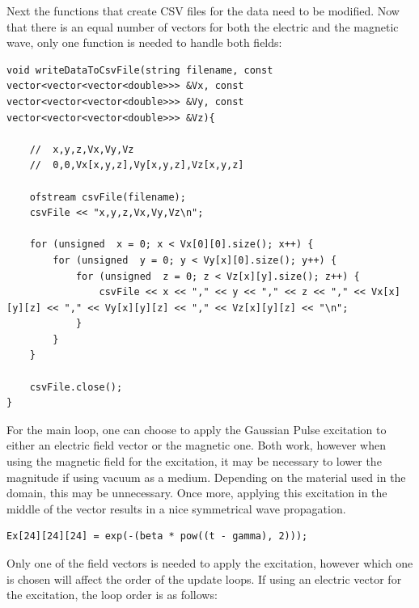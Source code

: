 Next the functions that create CSV files for the data need to be modified. Now that there is an equal number of vectors for both the electric and the magnetic wave, only one function is needed to handle both fields:

\begin{verbatim}
void writeDataToCsvFile(string filename, const vector<vector<vector<double>>> &Vx, const vector<vector<vector<double>>> &Vy, const vector<vector<vector<double>>> &Vz){
	
	//	x,y,z,Vx,Vy,Vz
	//	0,0,Vx[x,y,z],Vy[x,y,z],Vz[x,y,z]
	
	ofstream csvFile(filename);
	csvFile << "x,y,z,Vx,Vy,Vz\n";
	
	for (unsigned  x = 0; x < Vx[0][0].size(); x++) {
		for (unsigned  y = 0; y < Vy[x][0].size(); y++) {
			for (unsigned  z = 0; z < Vz[x][y].size(); z++) {
				csvFile << x << "," << y << "," << z << "," << Vx[x][y][z] << "," << Vy[x][y][z] << "," << Vz[x][y][z] << "\n";
			}
		}
	}
	
	csvFile.close();
}
\end{verbatim}

For the main loop, one can choose to apply the Gaussian Pulse excitation to either an electric field vector or the magnetic one. Both work, however when using the magnetic field for the excitation, it may be necessary to lower the magnitude if using vacuum as a medium. Depending on the material used in the domain, this may be unnecessary. Once more, applying this excitation in the middle of the vector results in a nice symmetrical wave propagation.

\begin{verbatim}
Ex[24][24][24] = exp(-(beta * pow((t - gamma), 2)));
\end{verbatim}

Only one of the field vectors is needed to apply the excitation, however which one is chosen will affect the order of the update loops. If using an electric vector for the excitation, the loop order is as follows:


